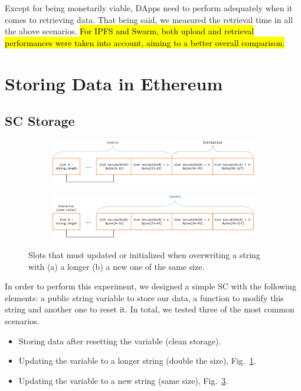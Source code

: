 Except for being monetarily viable, DApps need to perform adequately when it comes to retrieving data. That being said, we measured the retrieval time in all the above scenarios. \hl{For IPFS and Swarm, both upload and retrieval performances were taken into account, aiming to a better overall comparison.}
\section{Storing Data in Ethereum}\label{sec:evaluation_ethereum}
\subsection{SC Storage}\label{subsection:evaluation_sc}
\begin{figure}[htbp]
    \begin{subfigure}{\linewidth}
        \centerline{\includegraphics[width=\textwidth]{figs/Storage1.pdf}}
        \caption{}
        \label{fig:arrays_1}
    \end{subfigure}
    \begin{subfigure}{\linewidth}
        \centerline{\includegraphics[width=\textwidth]{figs/Storage2.pdf}}
        \caption{}
        \label{fig:arrays_2}
    \end{subfigure}
    \caption{Slots that must updated or initialized when overwriting a string with (a) a longer (b) a new one of the same size.}
\end{figure}

In order to perform this experiment, we designed a simple SC with the following elements: a public string variable to store our data, a function to modify this string and another one to reset it. In total, we tested three of the most common scenarios.

\begin{itemize}[topsep=0pt, itemsep=0pt]
  \item Storing data after resetting the variable (clean storage).
  \item Updating the variable to a longer string (double the size), Fig.~\ref{fig:arrays_1}.
  \item Updating the variable to a new string (same size), Fig.~\ref{fig:arrays_2}.
\end{itemize}

